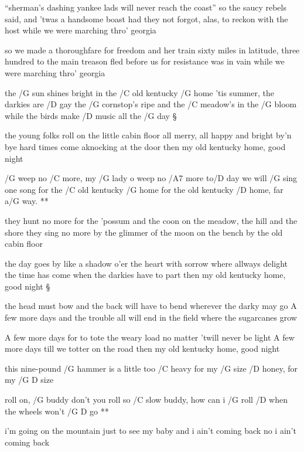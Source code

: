 ``sherman's dashing yankee lads will never reach the coast''
so the saucy rebels said, and 'twas a handsome boast
had they not forgot, alas, to reckon with the host
while we were marching thro' georgia \s

so we made a thoroughfare for freedom and her train
sixty miles in latitude, three hundred to the main
treason fled before us for resistance was in vain
while we were marching thro' georgia




the /G sun shines bright in the /C old kentucky /G home
'tis summer, the darkies are /D gay
the /G cornstop's ripe and the /C meadow's in the /G bloom
while the birds make /D music all the /G day \S

the young folks roll on the little cabin floor
all merry, all happy and bright
by'n bye hard times come aknocking at the door
then my old kentucky home, good night

\R  /G weep no /C more, my /G lady
    o weep no /A7 more to/D day
    we will /G sing one song for the /C old kentucky /G home
    for the old kentucky /D home, far a/G way. **

they hunt no more for the 'possum and the coon
on the meadow, the hill and the shore
they sing no more by the glimmer of the moon
on the bench by the old cabin floor \s

the day goes by like a shadow o'er the heart
with sorrow where allways delight
the time has come when the darkies have to part
then my old kentucky home, good night \S


the head must bow and the back will have to bend
wherever the darky may go
A few more days and the trouble all will end
in the field where the sugarcanes grow \s

A few more days for to tote the weary load
no matter 'twill never be light
A few more days till we totter on the road
then my old kentucky home, good night




this nine-pound /G hammer
is a little too /C heavy
for my /G size
/D honey, for my /{G D} size

\R  roll on, /G buddy
    don't you roll so /C slow
    buddy, how can i /G roll
    /D when the wheels won't /{G D} go **

i'm going on the mountain
just to see my baby
and i ain't coming back
no i ain't coming back \s

